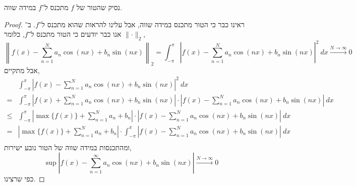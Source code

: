 \subquestion{}
נסיק שהטור של $f$ מתכנס ל־$f$ במידה שווה.
\begin{proof}
	ראינו כבר כי הטור מתכנס במידה שווה, אבל עלינו להראות שהוא מתכנס ל־$f$.
	ב־$\lVert \cdot \lVert_2$ אנו כבר יודעים כי הטור מתכנס ל־$f$, כלומר,
	\[
		\left\lVert f(x) - \sum_{n = 1}^N a_n \cos(nx) + b_n \sin(nx) \right\rVert_2
		= \int_{-\pi}^{\pi} {\left\lvert f(x) - \sum_{n = 1}^N a_n \cos(nx) + b_n \sin(nx) \right\rvert}^2\ dx
		\xrightarrow{N \to \infty} 0
	\]
	אבל מתקיים,
	\begin{align*}
		& \int_{-\pi}^{\pi} {\left\lvert f(x) - \sum_{n = 1}^N a_n \cos(nx) + b_n \sin(nx) \right\rvert}^2\ dx \\
		= & \int_{-\pi}^{\pi} {\left\lvert f(x) + \sum_{n = 1}^N a_n \cos(nx) + b_n \sin(nx) \right\rvert} \cdot {\left\lvert f(x) - \sum_{n = 1}^N a_n \cos(nx) + b_n \sin(nx) \right\rvert}\ dx \\
		\le & \int_{-\pi}^{\pi} {\left\lvert \max\{ f(x) \} + \sum_{n = 1}^N a_n + b_n \right\rvert} \cdot {\left\lvert f(x) - \sum_{n = 1}^N a_n \cos(nx) + b_n \sin(nx) \right\rvert}\ dx \\
		= & {\left\lvert \max\{ f(x) \} + \sum_{n = 1}^N a_n + b_n \right\rvert} \cdot \int_{-\pi}^{\pi} {\left\lvert f(x) - \sum_{n = 1}^N a_n \cos(nx) + b_n \sin(nx) \right\rvert}\ dx \\
	\end{align*}
	ומהתכנסות במידה שווה של הטור נובע ישירות,
	\[
		\sup \left\lvert f(x) - \sum_{n = 1}^\infty a_n \cos(nx) + b_n \sin(nx) \right\rvert
		\xrightarrow{N \to \infty} 0
	\]
	כפי שרצינו.
\end{proof}



